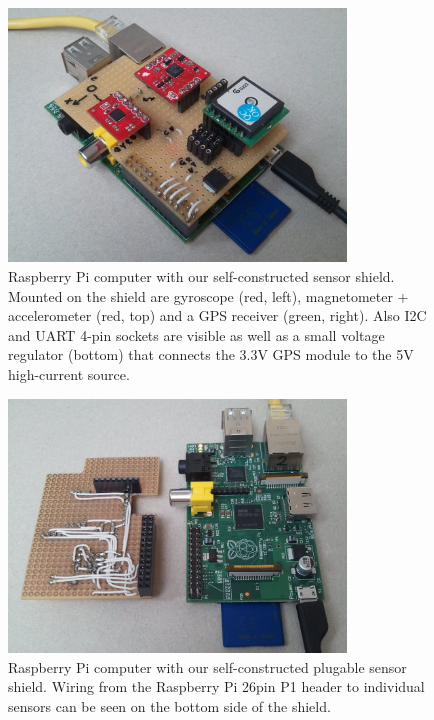 \begin{figure}
\centering
\includegraphics[width=0.8\textwidth]{figures/raspberry-sensors-top.jpg}
\caption{Raspberry Pi computer with our self-constructed sensor shield.
Mounted on the shield are gyroscope (red, left), magnetometer + accelerometer (red, top) and a GPS receiver (green, right).
Also I2C and UART 4-pin sockets are visible as well as a small voltage regulator (bottom) that connects the 3.3V GPS module to the 5V high-current source.}
\label{fig:raspberry-sensors-top}
\end{figure}

\begin{figure}
\centering
\includegraphics[width=0.8\textwidth]{figures/raspberry-sensors-open.jpg}
\caption{Raspberry Pi computer with our self-constructed plugable sensor shield.
Wiring from the Raspberry Pi 26pin P1 header to individual sensors can be seen on the bottom side of the shield.}
\label{fig:raspberry-sensors-open}
\end{figure}

